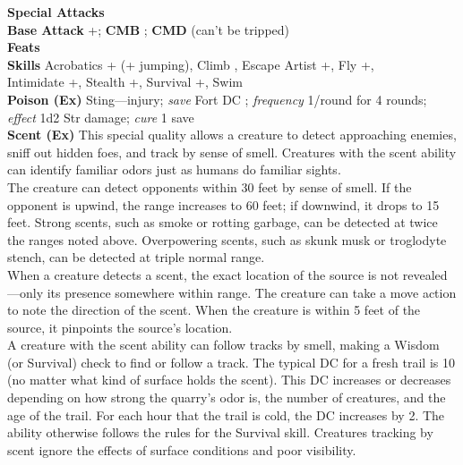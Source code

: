 \textbf{Special Attacks} \specialattacks \\
\textbf{Base Attack} +\baseattack; \textbf{CMB} \enhancedstat{+\allycmb}; \textbf{CMD} \enhancedstat{\allycmd} \hspace{1pt} (can't be tripped) \\ 
\textbf{Feats} \feats \\
\textbf{Skills} Acrobatics +\acrobaticsskill \hspace{1pt} (+\jumpskill \hspace{1pt} jumping), Climb \enhancedstat{+\climbskill}, Escape Artist +\escapeartistskill, Fly +\flyskill, \\ Intimidate +\intimidateskill, Stealth +\stealthskill, Survival +\survivalskill, Swim \enhancedstat{+\swimskill} \\

\textbf{Poison (Ex)} Sting---injury; \textit{save} Fort DC ; \textit{frequency} 1/round for 4 rounds; \\ \textit{effect} 1d2 Str damage; \textit{cure} 1 save \\

\textbf{Scent (Ex)} This special quality allows a creature to detect approaching enemies, sniff out hidden foes, and track by sense of smell. Creatures with the scent ability can identify familiar odors just as humans do familiar sights. \\

The creature can detect opponents within 30 feet by sense of smell. If the opponent is upwind, the range increases to 60 feet; if downwind, it drops to 15 feet. Strong scents, such as smoke or rotting garbage, can be detected at twice the ranges noted above. Overpowering scents, such as skunk musk or troglodyte stench, can be detected at triple normal range. \\

When a creature detects a scent, the exact location of the source is not revealed—only its presence somewhere within range. The creature can take a move action to note the direction of the scent. When the creature is within 5 feet of the source, it pinpoints the source's location. \\

A creature with the scent ability can follow tracks by smell, making a Wisdom (or Survival) check to find or follow a track. The typical DC for a fresh trail is 10 (no matter what kind of surface holds the scent). This DC increases or decreases depending on how strong the quarry's odor is, the number of creatures, and the age of the trail. For each hour that the trail is cold, the DC increases by 2. The ability otherwise follows the rules for the Survival skill. Creatures tracking by scent ignore the effects of surface conditions and poor visibility. \\

\newpage
